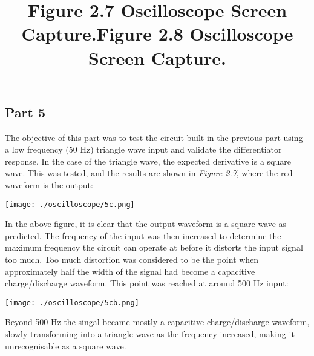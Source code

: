 \documentclass[12pt]{article}
\begin{document}
\subsection*{Part 5}
The objective of this part was to test the circuit built in the previous part using a low frequency (50 Hz) triangle wave input and validate the differentiator response. In the case of the triangle wave, the expected derivative is a square wave. This was tested, and the results are shown in \textit{Figure 2.7}, where the red waveform is the output:\par\vspace{6pt}
\title{\textbf{Figure 2.7} Oscilloscope Screen Capture.}
\begin{center}
 \texttt{[image: ./oscilloscope/5c.png]}
\end{center}
In the above figure, it is clear that the output waveform is a square wave as predicted. The frequency of the input was then increased to determine the maximum frequency the circuit can operate at before it distorts the input signal too much. Too much distortion was considered to be the point when approximately half the width of the signal had become a capacitive charge/discharge waveform. This point was reached at around 500 Hz input:\par\vspace{6pt}
\title{\textbf{Figure 2.8} Oscilloscope Screen Capture.}
\begin{center}
 \texttt{[image: ./oscilloscope/5cb.png]}
\end{center}
Beyond 500 Hz the singal became mostly a capacitive charge/discharge waveform, slowly transforming into a triangle wave as the frequency increased, making it unrecognisable as a square wave.
\end{document}
